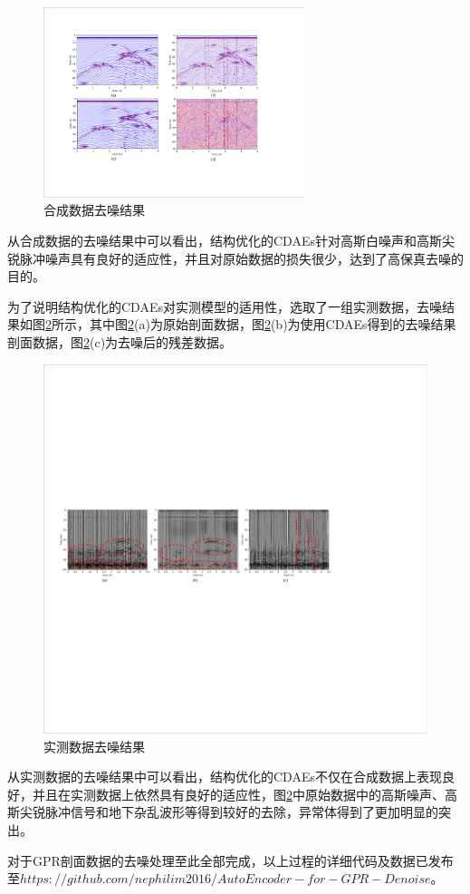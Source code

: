 \documentclass[11pt]{article}
\begin{document}
\begin{figure}[htbp]
\centering
\includegraphics[width=3in]{./FigureFolder/Foundation/CDAEs/Denoise.pdf}
\caption{合成数据去噪结果}
\label{Fig_Denoise}
\end{figure}
\par
从合成数据的去噪结果中可以看出，结构优化的CDAEs针对高斯白噪声和高斯尖锐脉冲噪声具有良好的适应性，并且对原始数据的损失很少，达到了高保真去噪的目的。
\par
为了说明结构优化的CDAEs对实测模型的适用性，选取了一组实测数据，去噪结果如图\ref{Fig_DenoiseWiggle}所示，其中图\ref{Fig_DenoiseWiggle}(a)为原始剖面数据，图\ref{Fig_DenoiseWiggle}(b)为使用CDAEs得到的去噪结果剖面数据，图\ref{Fig_DenoiseWiggle}(c)为去噪后的残差数据。
\begin{figure}[htbp]
\centering
\includegraphics[width=5.5in]{./FigureFolder/Foundation/CDAEs/DenoiseWiggle.pdf}
\caption{实测数据去噪结果}
\label{Fig_DenoiseWiggle}
\end{figure}
\par
从实测数据的去噪结果中可以看出，结构优化的CDAEs不仅在合成数据上表现良好，并且在实测数据上依然具有良好的适应性，图\ref{Fig_DenoiseWiggle}中原始数据中的高斯噪声、高斯尖锐脉冲信号和地下杂乱波形等得到较好的去除，异常体得到了更加明显的突出。
\par
对于GPR剖面数据的去噪处理至此全部完成，以上过程的详细代码及数据已发布至$https://github.com/nephilim2016/AutoEncoder-for-GPR-Denoise$。
\end{document}
